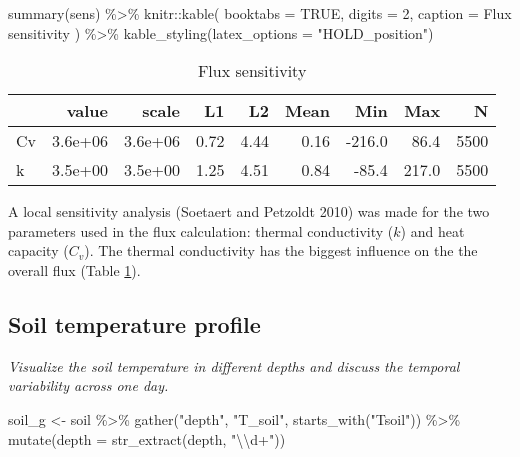 \documentclass[
]{article}
\newenvironment{Shaded}{\begin{snugshade}}{\end{snugshade}}
\newcommand{\AttributeTok}[1]{\textcolor[rgb]{0.77,0.63,0.00}{#1}}
\newcommand{\ConstantTok}[1]{\textcolor[rgb]{0.00,0.00,0.00}{#1}}
\newcommand{\DecValTok}[1]{\textcolor[rgb]{0.00,0.00,0.81}{#1}}
\newcommand{\FunctionTok}[1]{\textcolor[rgb]{0.00,0.00,0.00}{#1}}
\newcommand{\NormalTok}[1]{#1}
\newcommand{\OtherTok}[1]{\textcolor[rgb]{0.56,0.35,0.01}{#1}}
\newcommand{\SpecialCharTok}[1]{\textcolor[rgb]{0.00,0.00,0.00}{#1}}
\newcommand{\StringTok}[1]{\textcolor[rgb]{0.31,0.60,0.02}{#1}}
\begin{document}
\begin{Shaded}
\begin{Highlighting}[]
\FunctionTok{summary}\NormalTok{(sens) }\SpecialCharTok{\%\textgreater{}\%} 
\NormalTok{  knitr}\SpecialCharTok{::}\FunctionTok{kable}\NormalTok{(}
    \AttributeTok{booktabs =} \ConstantTok{TRUE}\NormalTok{,}
    \AttributeTok{digits =} \DecValTok{2}\NormalTok{,}
    \AttributeTok{caption =} \StringTok{\textquotesingle{}Flux sensitivity\textquotesingle{}}
\NormalTok{  ) }\SpecialCharTok{\%\textgreater{}\%} 
  \FunctionTok{kable\_styling}\NormalTok{(}\AttributeTok{latex\_options =} \StringTok{"HOLD\_position"}\NormalTok{)}
\end{Highlighting}
\end{Shaded}

\begin{table}[H]

\caption{\label{tab:sens}Flux sensitivity}
\centering
\begin{tabular}[t]{lrrrrrrrr}
\toprule
  & value & scale & L1 & L2 & Mean & Min & Max & N\\
\midrule
Cv & 3.6e+06 & 3.6e+06 & 0.72 & 4.44 & 0.16 & -216.0 & 86.4 & 5500\\
k & 3.5e+00 & 3.5e+00 & 1.25 & 4.51 & 0.84 & -85.4 & 217.0 & 5500\\
\bottomrule
\end{tabular}
\end{table}

A local sensitivity analysis (Soetaert and Petzoldt 2010) was made for the two parameters used in the flux calculation: thermal conductivity (\(k\)) and heat capacity (\(C_v\)). The thermal conductivity has the biggest influence on the the overall flux (Table \ref{tab:sens}).

\newpage

\hypertarget{soil-temperature-profile}{%
\subsection{Soil temperature profile}\label{soil-temperature-profile}}

\emph{Visualize the soil temperature in different depths and discuss the temporal variability across one day.}

\begin{Shaded}
\begin{Highlighting}[]
\NormalTok{soil\_g }\OtherTok{\textless{}{-}}\NormalTok{ soil }\SpecialCharTok{\%\textgreater{}\%} 
  \FunctionTok{gather}\NormalTok{(}\StringTok{"depth"}\NormalTok{, }\StringTok{"T\_soil"}\NormalTok{, }\FunctionTok{starts\_with}\NormalTok{(}\StringTok{"Tsoil"}\NormalTok{)) }\SpecialCharTok{\%\textgreater{}\%} 
  \FunctionTok{mutate}\NormalTok{(}\AttributeTok{depth =} \FunctionTok{str\_extract}\NormalTok{(depth, }\StringTok{"}\SpecialCharTok{\textbackslash{}\textbackslash{}}\StringTok{d+"}\NormalTok{))}
\end{Highlighting}
\end{Shaded}
\end{document}
